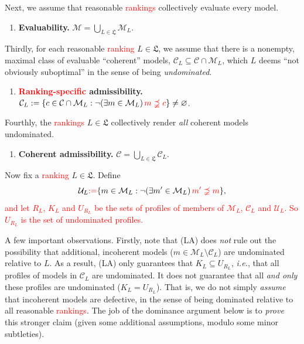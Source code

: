 \documentclass[11pt]{article}
\theoremstyle{definition}
\theoremstyle{remark}
\newcommand{\M}{\mathcal M}
\newcommand{\C}{\mathcal C}
\newcommand{\U}{\mathcal U}
\begin{document}
Next, we assume that reasonable \textcolor{red}{rankings} collectively evaluate every model.
\begin{enumerate}[label=\textbf{(E)},leftmargin=*]
\item \textbf{Evaluability.} $\M=\bigcup_{L\in\mathfrak L}\M_L$.
\end{enumerate}

Thirdly, for each reasonable \textcolor{red}{ranking} $L\in\mathfrak L$, we assume that there is a nonempty, maximal class of evaluable ``coherent'' models, $\C_L\subseteq\C\cap\M_L$, which $L$ deems ``not obviously suboptimal'' in the sense of being \textit{undominated}.

\begin{enumerate}[label=\textbf{(LA)},leftmargin=*]
\item \textbf{\textcolor{red}{Ranking-specific} admissibility.} $\C_L:=\{c\in\C\cap\M_L : \neg(\exists m\in\M_L)\textcolor{red}{\,m\precneqq c}\}\neq\varnothing$.
\end{enumerate}

Fourthly, the \textcolor{red}{rankings} $L\in\mathfrak L$ collectively render \textit{all} coherent models undominated.


\begin{enumerate}[label=\textbf{(A)},leftmargin=*]
\item \textbf{Coherent admissibility.} $\C=\bigcup_{L\in\mathfrak L}\C_L$.
\end{enumerate}

Now fix a \textcolor{red}{ranking} $L\in\mathfrak L$. Define
\[
 \U_L\textcolor{red}{:=}\{m\in\M_L:\neg(\exists m'\in\M_L)\textcolor{red}{\,m'\precneqq m}\},
\]
\textcolor{red}{and let $R_L$, $K_L$ and $U_{R_L}$ be the sets of profiles of members of $\M_L$, $\C_L$ and $\U_L$. So $U_{R_L}$ is the set of undominated profiles.}



A few important observations. Firstly, note that (LA) does \textit{not} rule out the possibility that additional, incoherent models ($m\in\M_L\setminus\C_L$) are undominated relative to $L$. As a result, (LA) only guarantees that $K_L\subseteq U_{R_L}$, \textit{i.e.}, that all profiles of models in $\C_L$ are undominated. It does not guarantee that all \textit{and only} these profiles are undominated ($K_L=U_{R_L}$). That is, we do not simply \textit{assume} that incoherent models are defective, in the sense of being dominated relative to all reasonable \textcolor{red}{rankings}. The job of the dominance argument below is to \textit{prove} this stronger claim (given some additional assumptions, modulo some minor subtleties).
\end{document}
